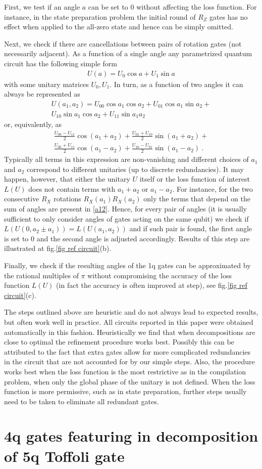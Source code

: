 \documentclass[twocolumn, amsfonts, amssymb, aps, nofootinbib]{revtex4-2}
\begin{document}
First, we test if an angle $a$ can be set to 0 without affecting the loss function. For instance, in the state preparation problem the initial round of $R_Z$ gates has no effect when applied to the all-zero state and hence can be simply omitted.

Next, we check if there are cancellations between pairs of rotation gates (not necessarily adjacent). As a function of a single angle any parametrized quantum circuit has the following simple form
\begin{align}
U(a)=U_0 \cos a+U_1\sin a
\end{align}
with some unitary matrices $U_0, U_1$. In turn, as a function of two angles it can always be represented as
\begin{multline}
U(a_1, a_2)=U_{00}\cos a_1\cos a_2+U_{01}\cos a_1\sin a_2+\\U_{10}\sin a_1\cos a_2+U_{11}\sin a_1 a_2
\end{multline}
or, equivalently, as
\begin{multline}
\frac{U_{00}-U_{11}}2\cos{(a_1+a_2)}+\frac{U_{01}+U_{10}}2\sin{(a_1+a_2)}+\\\frac{U_{00}+U_{11}}2\cos{(a_1-a_2)}+\frac{U_{10}-U_{01}}2\sin{(a_1-a_2)} \ . \label{a12}
\end{multline}
Typically all terms in this expression are non-vanishing and different choices of $a_1$ and $a_2$ correspond to different unitaries (up to discrete redundancies). It may happen, however, that either the unitary $U$ itself or the loss function of interest $L(U)$ does not contain terms with $a_1+a_2$ or $a_1-a_2$. For instance, for the two consecutive $R_X$ rotations $R_X(a_1)R_X(a_2)$ only the terms that depend on the sum of angles are present in \eqref{a12}. Hence, for every pair of angles (it is usually sufficient to only consider angles of gates acting on the same qubit) we check if $L(U(0, a_2\pm a_1))=L(U(a_1, a_2))$  and if such pair is found, the first angle is set to 0 and the second angle is adjusted accordingly. Results of this step are illustrated at fig.\ref{fig ref circuit}(b). 

Finally, we check if the resulting angles of the 1q gates can be approximated by the rational multiples of $\pi$ without compromising the accuracy of the loss function $L(U)$ (in fact the accuracy is often improved at step), see fig.\ref{fig ref circuit}(c). 


The steps outlined above are heuristic and do not always lead to expected results, but often work well in practice. All circuits reported in this paper were obtained automatically in this fashion. Heuristically we find that when decompositions are close to optimal the refinement procedure works best. Possibly this can be attributed to the fact that extra gates allow for more complicated redundancies in the circuit that are not accounted for by our simple steps. Also, the procedure works best when the loss function is the most restrictive as in the compilation problem, when only the global phase of the unitary is not defined. When the loss function is more permissive, such as in state preparation, further steps usually need to be taken to eliminate all redundant gates.

\section{4q gates featuring in decomposition of 5q Toffoli gate \label{app 5q}}




\end{document}
